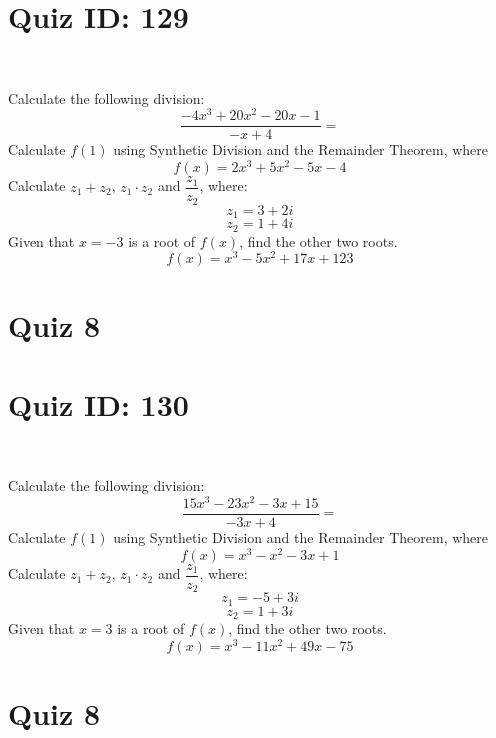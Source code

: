 \documentclass{exam}
\begin{document}
\section*{Quiz ID: 129}
\vspace{0.5cm}\
\vspace{1cm}\
\begin{questions}
\question Calculate the following division:\[\dfrac{
-4x^3 + 20x^2 - 20x - 1}{
-x + 4}=\] \makeemptybox{\stretch{2}}
\question Calculate $f(1)$ using Synthetic Division and the Remainder Theorem, where\[f(x) = 
2x^3 + 5x^2 - 5x - 4\]
\newpage\question Calculate $z_1+z_2$, $z_1\cdot z_2$ and $\dfrac{z_1}{z_2}$, where:\[z_1=3+2\mathit{i}\]\[z_2=1+4\mathit{i}\]
\question Given that $x=-3$ is a root of $f(x)$, find the other two roots.\[f(x)=
x^3 - 5x^2 + 17x + 123\]\makeemptybox{\stretch{1}}
\end{questions}\newpage
\newpage
\section*{Quiz 8}
\section*{Quiz ID: 130}
\vspace{0.5cm}\
\vspace{1cm}\
\begin{questions}
\question Calculate the following division:\[\dfrac{
15x^3 - 23x^2 - 3x + 15}{
-3x + 4}=\] 
\question Calculate $f(1)$ using Synthetic Division and the Remainder Theorem, where\[f(x) = 
x^3 - x^2 - 3x + 1\]
\newpage\question Calculate $z_1+z_2$, $z_1\cdot z_2$ and $\dfrac{z_1}{z_2}$, where:\[z_1=-5+3\mathit{i}\]\[z_2=1+3\mathit{i}\]\makeemptybox{\stretch{1}}
\question Given that $x=3$ is a root of $f(x)$, find the other two roots.\[f(x)=
x^3 - 11x^2 + 49x - 75\]\makeemptybox{\stretch{1}}
\end{questions}\newpage
\newpage
\section*{Quiz 8}
\end{document}
